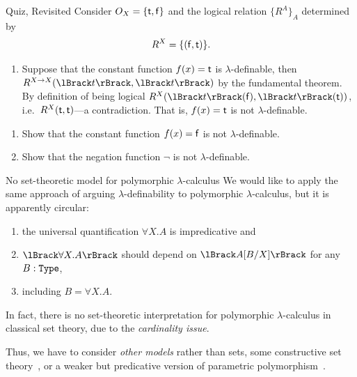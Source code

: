 \begin{frame}{Quiz, Revisited}
  Consider $O_X = \{\mathsf{t}, \mathsf{f}\}$ and the logical relation $\{R^A\}_{A}$ determined by
  \[
    R^{X} = \{(\mathsf{f}, \mathsf{t})\}.
  \]

  \begin{enumerate}
    \item Suppose that the constant function $f(x) = \mathsf{t}$ is $\lambda$-definable, then $R^{X \to X}(\Brackets{t}, \Brackets{t})$ by the fundamental theorem.
      By definition of being logical $R^{X}(\Brackets{t}(\bff), \Brackets{t}(\btt))$, i.e.\ $R^{X}(\mathsf{t}, \mathsf{t})$---a contradiction.
      That is, $f(x) = \mathsf{t}$ is not $\lambda$-definable.
  \end{enumerate}
  \begin{exercise*}
    \begin{enumerate}
      \item Show that the constant function $f(x) = \mathsf{f}$ is not $\lambda$-definable.
      \item Show that the negation function $\neg$ is not $\lambda$-definable.
    \end{enumerate}
  \end{exercise*}
\end{frame}

\begin{frame}{No set-theoretic model for polymorphic $\lambda$-calculus}
  We would like to apply the same approach of arguing $\lambda$-definability to polymorphic $\lambda$-calculus, but it is apparently circular: 
  \begin{enumerate}
    \item the universal quantification  $\forall X. A$ is \alert{impredicative} and
    \item $\Brackets{\forall X. A}$ should depend on $\Brackets{A \subst{B}{X}}$ for any $B : \mathtt{Type}$,
    \item including $B = \forall X. A$.
  \end{enumerate}

  In fact, there is no set-theoretic interpretation for polymorphic $\lambda$-calculus \cite{Reynolds1984} in classical set theory, due to the \emph{cardinality issue}.

  Thus, we have to consider \emph{other models} rather than sets, some constructive set theory~\cite{Pitts1987}, or a weaker but predicative version of parametric polymorphism~\cite{Leivant1991}.
\end{frame}

